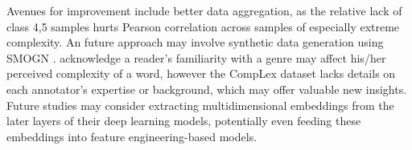 \documentclass{dcthesis}
\theoremstyle{definition}
\theoremstyle{remark}
\begin{document}
Avenues for improvement include better data aggregation, as the relative lack of class 4,5 samples hurts Pearson correlation across samples of especially extreme complexity. An future approach may involve synthetic data generation using SMOGN \citep{pmlrv74branco17a}. \citet{shardlow2020complex} acknowledge a reader's familiarity with a genre may affect his/her perceived complexity of a word, however the CompLex dataset lacks details on each annotator's expertise or background, which may offer valuable new insights. Future studies may consider extracting multidimensional embeddings from the later layers of their deep learning models, potentially even feeding these embeddings into feature engineering-based models.

%

\backmatter





\end{document}
